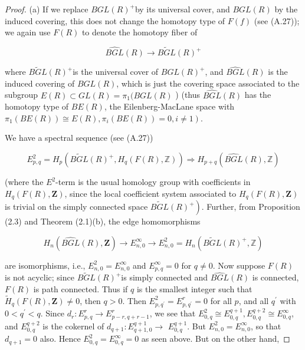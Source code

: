 \begin{proof}
(a) If we replace $B G L(R)^{+}$by its universal cover, and $B G L(R)$ by the induced covering, this does not change the homotopy type of $F(f)$ (see (A.27)); we again use $F(R)$ to denote the homotopy fiber of

    $$
    \widehat{B G L}(R) \rightarrow \widetilde{B G L}(R)^{+}
    $$
    
    where $\widetilde{B G L}(R)^{+}$is the universal cover of $B G L(R)^{+}$, and $\widehat{B G L}(R)$ is the induced covering of $B G L(R)$, which is just the covering space associated to the subgroup $E(R) \subset G L(R)=\pi_1(B G L(R)$ ) (thus $\widehat{B G L}(R)$ has the homotopy type of $B E(R)$, the Eilenberg-MacLane space with $\left.\pi_1(B E(R)) \cong E(R), \pi_i(B E(R))=0, i \neq 1\right)$.
    
    We have a spectral sequence (see (A.27))
    
    $$
    E_{p, q}^2=H_p\left(\widetilde{B G L}(R)^{+}, H_q(F(R), \mathbb{Z})\right) \Longrightarrow H_{p+q}(\widehat{B G L}(R), \mathbb{Z})
    $$
    
    (where the $E^2$-term is the usual homology group with coefficients in $H_q(F(R), \mathbf{Z})$, since the local coefficient system associated to $H_q(F(R), \mathbf{Z})$ is trivial on the simply connected space $\left.\widetilde{B G L}(R)^{+}\right)$. Further, from Proposition (2.3) and Theorem (2.1)(b), the edge homomorphisms
    
    $$
    H_n(\widehat{B G L}(R), \mathbf{Z}) \rightarrow E_{n, 0}^{\infty} \longrightarrow E_{n, 0}^2=H_n\left(\widetilde{B G L}(R)^{+}, \mathbb{Z}\right)
    $$
    
    are isomorphisms, i.e., $E_{n, 0}^2=E_{n, 0}^{\infty}$ and $E_{p, q}^{\infty}=0$ for $q \neq 0$.
    Now suppose $F(R)$ is not acyclic; since $\widetilde{B G L}(R)^{+}$is simply connected and $\widehat{B G L}(R)$ is connected, $F(R)$ is path connected. Thus if $q$ is the smallest integer such that $\tilde{H}_q(F(R), \mathbf{Z}) \neq 0$, then $q>0$. Then $E_{p, q^{\prime}}^2=E_{p, q^{\prime}}^r=0$ for all $p$, and all $q^{\prime}$ with $0<q^{\prime}<q$. Since $d_r: E_{p, q}^r \longrightarrow E_{p-r, q+r-1}^r$, we see that $E_{0, q}^2 \cong E_{0, q}^{q+1}, E_{0, q}^{q+2} \cong E_{0, q}^{\infty}$, and $E_{0, q}^{q+2}$ is the cokernel of $d_{q+1}: E_{q+1,0}^{q+1} \longrightarrow$ $E_{0, q}^{q+1}$. But $E_{n, 0}^2=E_{n, 0}^{\infty}$, so that $d_{q+1}=0$ also. Hence $E_{0, q}^2=E_{0, q}^{\infty}=0$ as seen above. But on the other hand,
    

\end{proof}
